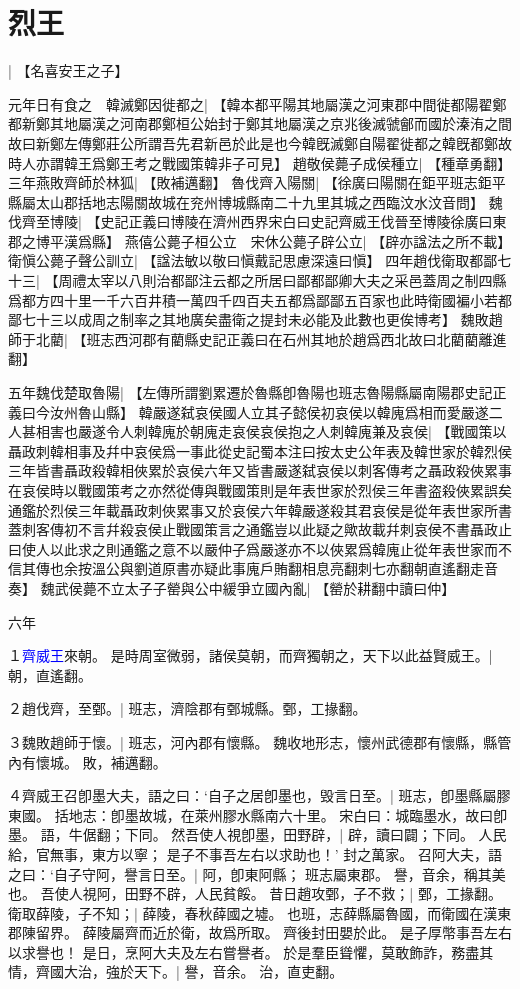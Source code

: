 \section{烈王}|{
	【名喜安王之子】}
\par
元年日有食之　韓滅鄭因徙都之|{
	【韓本都平陽其地屬漢之河東郡中間徙都陽翟鄭都新鄭其地屬漢之河南郡鄭桓公始封于鄭其地屬漢之京兆後滅虢鄶而國於溱洧之間故曰新鄭左傳鄭莊公所謂吾先君新邑於此是也今韓旣滅鄭自陽翟徙都之韓旣都鄭故時人亦謂韓王爲鄭王考之戰國策韓非子可見】}
趙敬侯薨子成侯種立|{
	【種章勇翻】}
三年燕敗齊師於林狐|{
	【敗補邁翻】}
魯伐齊入陽關|{
	【徐廣曰陽關在鉅平班志鉅平縣屬太山郡括地志陽關故城在兖州博城縣南二十九里其城之西臨汶水汶音問】}
魏伐齊至博陵|{
	【史記正義曰博陵在濟州西界宋白曰史記齊威王伐晉至博陵徐廣曰東郡之博平漢爲縣】}
燕僖公薨子桓公立　宋休公薨子辟公立|{
	【辟亦諡法之所不載】}
衛愼公薨子聲公訓立|{
	【諡法敏以敬曰愼戴記思慮深遠曰愼】}
四年趙伐衛取都鄙七十三|{
	【周禮太宰以八則治都鄙注云都之所居曰鄙都鄙卿大夫之采邑蓋周之制四縣爲都方四十里一千六百井積一萬四千四百夫五都爲鄙鄙五百家也此時衛國褊小若都鄙七十三以成周之制率之其地廣矣盡衛之提封未必能及此數也更俟博考】}
魏敗趙師于北藺|{
	【班志西河郡有藺縣史記正義曰在石州其地於趙爲西北故曰北藺藺離進翻】}
\par
五年魏伐楚取魯陽|{
	【左傳所謂劉累遷於魯縣卽魯陽也班志魯陽縣屬南陽郡史記正義曰今汝州魯山縣】}
韓嚴遂弑哀侯國人立其子懿侯初哀侯以韓廆爲相而愛嚴遂二人甚相害也嚴遂令人刺韓廆於朝廆走哀侯哀侯抱之人刺韓廆兼及哀侯|{
	【戰國策以聶政刺韓相事及幷中哀侯爲一事此從史記蜀本注曰按太史公年表及韓世家於韓烈侯三年皆書聶政殺韓相俠累於哀侯六年又皆書嚴遂弑哀侯以刺客傳考之聶政殺俠累事在哀侯時以戰國策考之亦然從傳與戰國策則是年表世家於烈侯三年書盗殺俠累誤矣通鑑於烈侯三年載聶政刺俠累事又於哀侯六年韓嚴遂殺其君哀侯是從年表世家所書蓋刺客傳初不言幷殺哀侯止戰國策言之通鑑豈以此疑之歟故載幷刺哀侯不書聶政止曰使人以此求之則通鑑之意不以嚴仲子爲嚴遂亦不以俠累爲韓廆止從年表世家而不信其傳也余按溫公與劉道原書亦疑此事廆戶賄翻相息亮翻刺七亦翻朝直遙翻走音奏】}
魏武侯薨不立太子子罃與公中緩爭立國內亂|{
	【罃於耕翻中讀曰仲】}
\par
六年

１\textcolor{blue}{齊威王}來朝。
是時周室微弱，諸侯莫朝，而齊獨朝之，天下以此益賢威王。|{
	朝，直遙翻。
	}

２趙伐齊，至鄄。|{
	班志，濟陰郡有鄄城縣。鄄，工掾翻。
	}

３魏敗趙師于懷。|{
	班志，河內郡有懷縣。
	魏收地形志，懷州武德郡有懷縣，縣管內有懷城。
	敗，補邁翻。
	}

４齊威王召卽墨大夫，語之曰：‘自子之居卽墨也，毁言日至。|{
	班志，卽墨縣屬膠東國。
	括地志：卽墨故城，在萊州膠水縣南六十里。
	宋白曰：城臨墨水，故曰卽墨。
	語，牛倨翻；下同。
	}
然吾使人視卽墨，田野辟，|{
	辟，讀曰闢；下同。
	}
人民給，官無事，東方以寧；
是子不事吾左右以求助也！’
封之萬家。
召阿大夫，語之曰：‘自子守阿，譽言日至。|{
	阿，卽東阿縣；
	班志屬東郡。
	譽，音余，稱其美也。
	}
吾使人視阿，田野不辟，人民貧餒。
昔日趙攻鄄，子不救；|{
	鄄，工掾翻。
	}
衛取薛陵，子不知；|{
	薛陵，春秋薛國之墟。
	也班，志薛縣屬魯國，而衛國在漢東郡陳留界。
	薛陵屬齊而近於衛，故爲所取。
	齊後封田嬰於此。
	}
是子厚幣事吾左右以求譽也！
是日，烹阿大夫及左右嘗譽者。
於是羣臣聳懼，莫敢飾詐，務盡其情，齊國大治，強於天下。|{
	譽，音余。
	治，直吏翻。
	}

